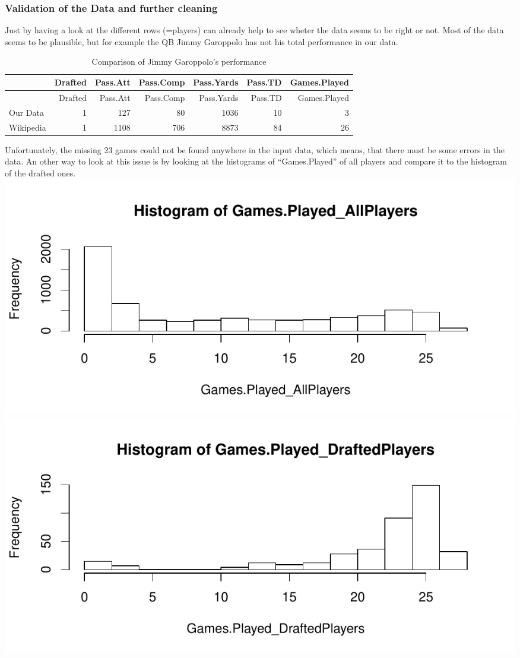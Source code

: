 \documentclass[]{article}
\begin{document}
\hypertarget{validation-of-the-data-and-further-cleaning}{%
\subsubsection{Validation of the Data and further
cleaning}\label{validation-of-the-data-and-further-cleaning}}

Just by having a look at the different rows (=players) can already help
to see wheter the data seems to be right or not. Most of the data seems
to be plausible, but for example the QB Jimmy Garoppolo has not his
total performance in our data.

\begin{longtable}[]{@{}lrrrrrr@{}}
\caption{Comparison of Jimmy Garoppolo's performance}\tabularnewline
\toprule
& Drafted & Pass.Att & Pass.Comp & Pass.Yards & Pass.TD &
Games.Played\tabularnewline
\midrule
\endfirsthead
\toprule
& Drafted & Pass.Att & Pass.Comp & Pass.Yards & Pass.TD &
Games.Played\tabularnewline
\midrule
\endhead
Our Data & 1 & 127 & 80 & 1036 & 10 & 3\tabularnewline
Wikipedia & 1 & 1108 & 706 & 8873 & 84 & 26\tabularnewline
\bottomrule
\end{longtable}

Unfortunately, the missing 23 games could not be found anywhere in the
input data, which means, that there must be some errors in the data. An
other way to look at this issue is by looking at the histograms of
``Games.Played'' of all players and compare it to the histogram of the
drafted ones.
\includegraphics{RM_DataHandling_files/figure-latex/unnamed-chunk-3-1.pdf}
\includegraphics{RM_DataHandling_files/figure-latex/unnamed-chunk-3-2.pdf}
\end{document}
